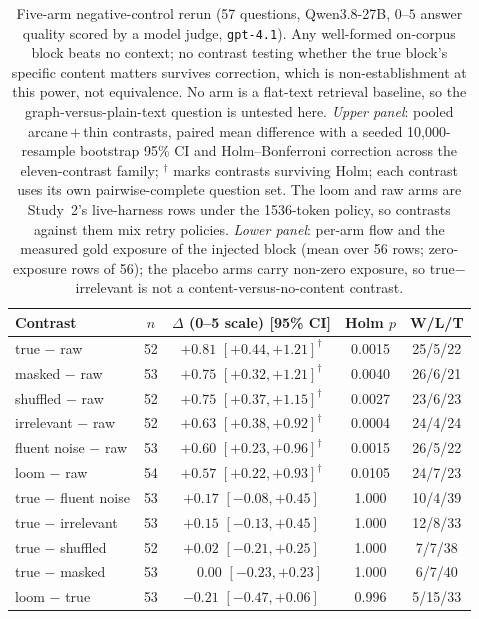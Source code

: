 \documentclass[10pt,twocolumn]{article}
\begin{document}
\begin{table}[t]\centering\small
\caption{Five-arm negative-control rerun (57 questions, Qwen3.8-27B, $0$--$5$ answer quality scored
by a model judge, \texttt{gpt-4.1}). Any well-formed on-corpus block beats no context; no contrast
testing whether the true block's specific content matters survives correction, which is
non-establishment at this power, not equivalence. No arm is a flat-text retrieval baseline, so the
graph-versus-plain-text question is untested here. \emph{Upper panel}: pooled arcane\,$+$\,thin
contrasts, paired mean difference with a seeded 10{,}000-resample bootstrap 95\% CI and
Holm--Bonferroni correction across the eleven-contrast family; $^{\dagger}$ marks contrasts surviving
Holm; each contrast uses its own pairwise-complete question set. The loom and raw arms are Study~2's
live-harness rows under the 1536-token policy, so contrasts against them mix retry policies.
\emph{Lower panel}: per-arm flow and the measured gold exposure of the injected block (mean over
56 rows; zero-exposure rows of 56); the placebo arms carry non-zero exposure, so true$-$irrelevant is
not a content-versus-no-content contrast.}
\label{tab:controls}
\begin{tabular}{lcccc}
\toprule
Contrast & $n$ & $\Delta$ (0--5 scale) [95\% CI] & Holm $p$ & W/L/T \\
\midrule
true $-$ raw          & 52 & $+0.81$ $[+0.44,+1.21]^{\dagger}$ & 0.0015 & 25/5/22 \\
masked $-$ raw        & 53 & $+0.75$ $[+0.32,+1.21]^{\dagger}$ & 0.0040 & 26/6/21 \\
shuffled $-$ raw      & 52 & $+0.75$ $[+0.37,+1.15]^{\dagger}$ & 0.0027 & 23/6/23 \\
irrelevant $-$ raw    & 52 & $+0.63$ $[+0.38,+0.92]^{\dagger}$ & 0.0004 & 24/4/24 \\
fluent noise $-$ raw  & 53 & $+0.60$ $[+0.23,+0.96]^{\dagger}$ & 0.0015 & 26/5/22 \\
loom $-$ raw          & 54 & $+0.57$ $[+0.22,+0.93]^{\dagger}$ & 0.0105 & 24/7/23 \\
true $-$ fluent noise & 53 & $+0.17$ $[-0.08,+0.45]$ & 1.000 & 10/4/39 \\
true $-$ irrelevant   & 53 & $+0.15$ $[-0.13,+0.45]$ & 1.000 & 12/8/33 \\
true $-$ shuffled     & 52 & $+0.02$ $[-0.21,+0.25]$ & 1.000 & 7/7/38 \\
true $-$ masked       & 53 & $\phantom{+}0.00$ $[-0.23,+0.23]$ & 1.000 & 6/7/40 \\
loom $-$ true         & 53 & $-0.21$ $[-0.47,+0.06]$ & 0.996 & 5/15/33 \\
\bottomrule
\end{tabular}


\end{table}
\end{document}
